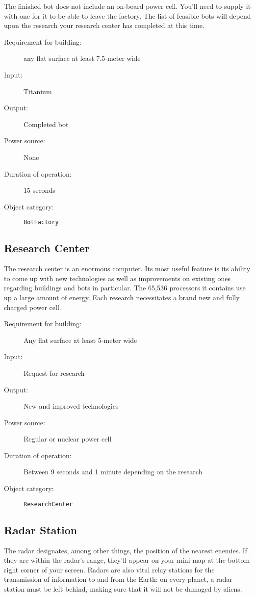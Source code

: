 The finished bot does not include an on-board power cell. You'll need to supply it with one for it to be able to leave the factory. The list of feasible bots will depend upon the research your research center has completed at this time.

\begin{description}
    \item[Requirement for building:] any flat surface at least 7.5-meter wide
    \item[Input:] Titanium
    \item[Output:] Completed bot
    \item[Power source:] None
    \item[Duration of operation:] 15 seconds
    \item[Object category:] \texttt{BotFactory}
\end{description}


\subsection{Research Center}

The research center is an enormous computer. Its most useful feature is its ability to come up with new technologies as well as improvements on existing ones regarding buildings and bots in particular. The 65,536 processors it contains use up a large amount of energy. Each research necessitates a brand new and fully charged power cell.

\begin{description}
    \item[Requirement for building:] Any flat surface at least 5-meter wide
    \item[Input:] Request for research
    \item[Output:] New and improved technologies
    \item[Power source:] Regular or nuclear power cell
    \item[Duration of operation:] Between 9 seconds and 1 minute depending on the research
    \item[Object category:] \texttt{ResearchCenter}
\end{description}


\subsection{Radar Station}

The radar designates, among other things, the position of the nearest enemies. If they are within the radar's range, they'll appear on your mini-map at the bottom right corner of your screen. Radars are also vital relay stations for the transmission of information to and from the Earth: on every planet, a radar station must be left behind, making sure that it will not be damaged by aliens. 

